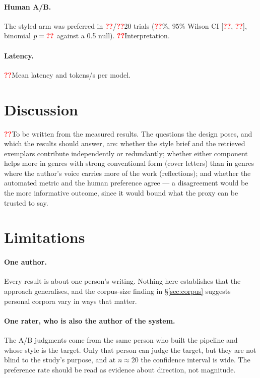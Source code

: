 \documentclass[11pt]{article}
\newcommand{\pending}[1][??]{\textcolor{red}{\textbf{#1}}}
\begin{document}
\paragraph{Human A/B.} The styled arm was preferred in \pending{}/\pending{20}
trials (\pending\%, 95\% Wilson CI [\pending, \pending], binomial $p =
\pending$ against a 0.5 null). \pending{Interpretation.}

\paragraph{Latency.} \pending{Mean latency and tokens/s per model.}

\section{Discussion}
\label{sec:discussion}

\pending{To be written from the measured results.} The questions the design
poses, and which the results should answer, are: whether the style brief and the
retrieved exemplars contribute independently or redundantly; whether either
component helps more in genres with strong conventional form (cover letters) than
in genres where the author's voice carries more of the work (reflections); and
whether the automated metric and the human preference agree --- a disagreement
would be the more informative outcome, since it would bound what the proxy can be
trusted to say.

\section{Limitations}
\label{sec:limitations}

\paragraph{One author.} Every result is about one person's writing. Nothing here
establishes that the approach generalises, and the corpus-size finding in
\S\ref{sec:corpus} suggests personal corpora vary in ways that matter.

\paragraph{One rater, who is also the author of the system.} The A/B judgments
come from the same person who built the pipeline and whose style is the target.
Only that person can judge the target, but they are not blind to the study's
purpose, and at $n \approx 20$ the confidence interval is wide. The preference
rate should be read as evidence about direction, not magnitude.
\end{document}
